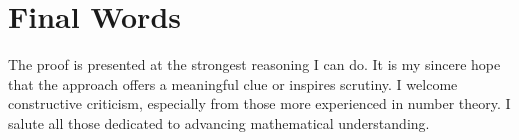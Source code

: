 \documentclass[12pt]{article}
\theoremstyle{definition}
\begin{document}
\section{Final Words}
The proof is presented at the strongest reasoning I can do. It is my sincere hope that the approach offers a meaningful clue or inspires scrutiny. I welcome constructive criticism, especially from those more experienced in number theory. I salute all those dedicated to advancing mathematical understanding.
\end{document}

